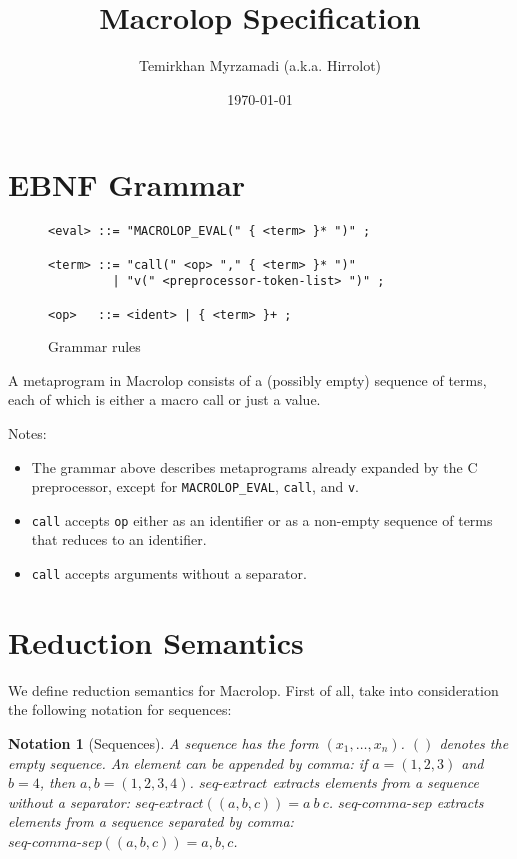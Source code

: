 \documentclass[a4paper, 12pt]{article}
\newtheorem{notation}{Notation}
\begin{document}
\title{Macrolop Specification}
\date{\today}
\author{Temirkhan Myrzamadi (a.k.a. Hirrolot)}
\maketitle

\tableofcontents

\newpage

\section{EBNF Grammar}

\begin{figure}[H]
    \caption{Grammar rules}

\begin{verbatim}
<eval> ::= "MACROLOP_EVAL(" { <term> }* ")" ;

<term> ::= "call(" <op> "," { <term> }* ")"
         | "v(" <preprocessor-token-list> ")" ;

<op>   ::= <ident> | { <term> }+ ;
\end{verbatim}

\end{figure}

A metaprogram in Macrolop consists of a (possibly empty) sequence of terms, each of which
is either a macro call or just a value.

Notes:

\begin{itemize}
    \item The grammar above describes metaprograms already expanded by the C preprocessor,
    except for \texttt{MACROLOP\_EVAL}, \texttt{call}, and \texttt{v}.
    \item \texttt{call} accepts \texttt{op} either as an identifier or as a non-empty
    sequence of terms that reduces to an identifier.
    \item \texttt{call} accepts arguments without a separator.
\end{itemize}

\section{Reduction Semantics}

We define reduction semantics for Macrolop. First of all, take into consideration the
following notation for sequences:

\begin{notation}[Sequences]
    A sequence has the form $(x_1, \ldots, x_n)$. $()$ denotes the empty sequence.
    An element can be appended by comma: if $a = (1, 2, 3)$ and $b = 4$, then
    $a, b = (1, 2, 3, 4)$.
    $seq\mbox{-}extract$ extracts elements from a sequence without a separator:
    $seq\mbox{-}extract((a, b, c)) = a \ b \ c$.
    $seq\mbox{-}comma\mbox{-}sep$ extracts elements from a sequence separated by comma: \\
    $seq\mbox{-}comma\mbox{-}sep((a, b, c)) = a, b, c$. 
\end{notation}
\end{document}
